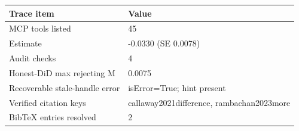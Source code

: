 \begin{tabular}{ll}
    \toprule
    Trace item & Value \\
    \midrule
    MCP tools listed & 45 \\
    Estimate & -0.0330 (SE 0.0078) \\
    Audit checks & 4 \\
    Honest-DiD max rejecting M & 0.0075 \\
    Recoverable stale-handle error & isError=True; hint present \\
    Verified citation keys & callaway2021difference, rambachan2023more \\
    BibTeX entries resolved & 2 \\
    \bottomrule
\end{tabular}
